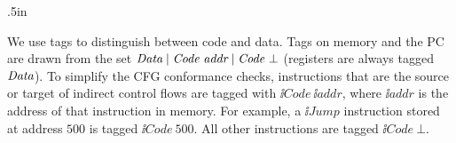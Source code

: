 \newcommand{\CODEname}[0]{\ii{Code}}
\newcommand{\CODE}[1]{\CODEname~#1}

\makeatletter
\newdimen\OPCODEwidth
\OPCODEwidth .5in
\newdimen\RULEwidth
\newcommand{\TRUE}{\text{\tt true}}
\newcommand{\RULE}[9]{
\gdef\RULEARROW{\ifthenelse{\equal{#7}{}}{\Rightarrow}{\rightarrow}}  %
\gdef\RULEINPUT{(#2,#3,#4,#5,#6)}
\gdef\RULEOUTPUT{(#8,#9)}
\gdef\RULECOND{%
  \ifthenelse{\equal{#7}{}}{}%
             {\ifthenelse{\equal{#7}{\TRUE}}{}%
                         {\mathrm{\;if\;}#7}}%
}
&& \hspace*{-18.5em}
  \hbox to 1in {
      \hbox to \OPCODEwidth {\ifx&#1&\else$#1$\ : \fi}
      \setbox \@tempboxa \hbox{$\RULEINPUT \RULEARROW \RULEOUTPUT \RULECOND$}
      \RULEwidth \wd\@tempboxa
      \ifdim \RULEwidth < 2.4in
        \box\@tempboxa
      \else\ifdim \RULEwidth < 4.8in
        $ \hspace*{-1.3em}
        \begin{array}[t]{@{}l@{\ }l}
            & \RULEINPUT \\
            \RULEARROW
            & \RULEOUTPUT\RULECOND
        \end{array}
       $
      \else
        $ \hspace*{-1.3em}
        \begin{array}[t]{@{}l@{}l}
            & \ \RULEINPUT \\
            \RULEARROW
            & \ \RULEOUTPUT \\
            & \RULECOND
        \end{array}
       $
     \fi\fi
  }
}

\newcommand{\RULEWITHPREMISE}[9]{
\typicallabel{}
  \infrule{#7}{\ii{#1} : (#2, #3, #4, #5, #6) \to (#8,#9)}
\typicallabel{MkKey}
}

We use tags to distinguish between code and data.
%
Tags on memory and the PC are drawn from the set
%
$
\DATA \;|\; \CODE{\ii{addr}} \;|\; \CODE{\bot}
$
(registers are always tagged $\textit{Data}$).
%
To simplify the CFG conformance checks, instructions that are the
source or target of indirect control flows are tagged with
$\CODE{\ii{addr}}$, where $\ii{addr}$ is the address of that
instruction in memory.
%
For example, a $\ii{Jump}$ instruction stored at address $500$ is
tagged $\CODE{500}$.
%
All other instructions are tagged $\CODE{\bot}$.
%

